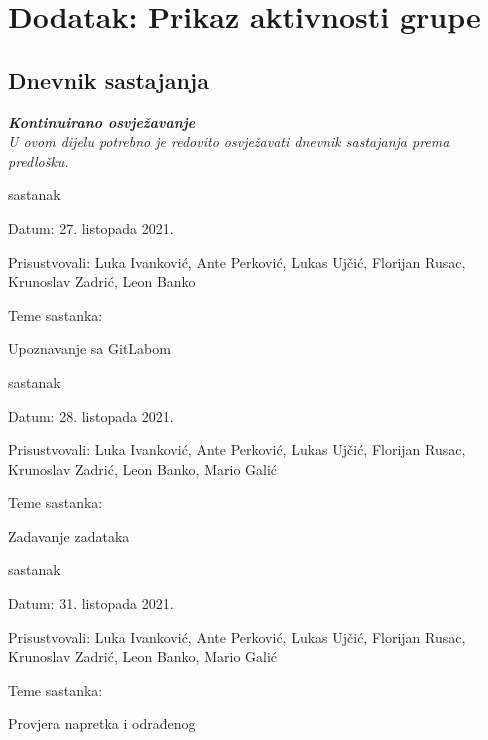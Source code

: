 \chapter*{Dodatak: Prikaz aktivnosti grupe}
		
		\section*{Dnevnik sastajanja}
		
		\textbf{\textit{Kontinuirano osvježavanje}}\\
		
		 \textit{U ovom dijelu potrebno je redovito osvježavati dnevnik sastajanja prema predlošku.}
		
		\begin{packed_enum}
			\item  sastanak
			
			\item[] \begin{packed_item}
				\item Datum: 27. listopada 2021.
				\item Prisustvovali: Luka Ivanković, Ante Perković, Lukas Ujčić, Florijan Rusac, Krunoslav Zadrić, Leon Banko
				\item Teme sastanka:
				\begin{packed_item}
					\item  Upoznavanje sa GitLabom
				\end{packed_item}
			\end{packed_item}
			
			\item  sastanak
			\item[] \begin{packed_item}
				\item Datum: 28. listopada 2021.
				\item Prisustvovali: Luka Ivanković, Ante Perković, Lukas Ujčić, Florijan Rusac, Krunoslav Zadrić, Leon Banko, Mario Galić 
				\item Teme sastanka:
				\begin{packed_item}
					\item  Zadavanje zadataka
				\end{packed_item}
			\end{packed_item}

			\item  sastanak
			\item[] \begin{packed_item}
				\item Datum: 31. listopada 2021.
				\item Prisustvovali: Luka Ivanković, Ante Perković, Lukas Ujčić, Florijan Rusac, Krunoslav Zadrić, Leon Banko, Mario Galić 
				\item Teme sastanka:
				\begin{packed_item}
					\item  Provjera napretka i odrađenog
				\end{packed_item}
			\end{packed_item}


\end{packed_enum}
